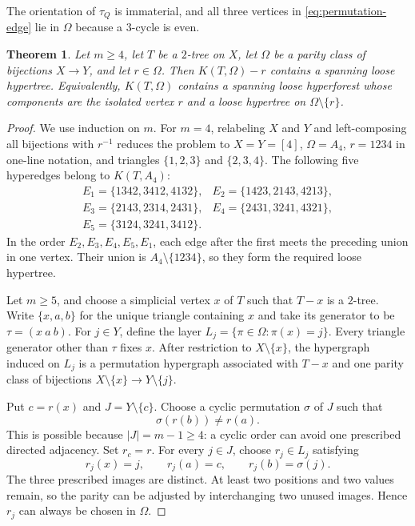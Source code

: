 \documentclass[4pt]{article} %
\newtheorem{theorem}{Theorem}[section]
\begin{document}
The orientation of $\tau_Q$ is immaterial, and all three vertices in
\eqref{eq:permutation-edge} lie in $\Omega$ because a $3$-cycle is even.

\begin{theorem}\label{thm:root-deleted}
Let $m\geq4$, let $T$ be a $2$-tree on $X$, let $\Omega$ be a parity class
of bijections $X\to Y$, and let $r\in\Omega$. Then $K(T,\Omega)-r$ contains
a spanning loose hypertree. Equivalently, $K(T,\Omega)$ contains a spanning
loose hyperforest whose components are the isolated vertex $r$ and a loose
hypertree on $\Omega\setminus\{r\}$.
\end{theorem}

\begin{proof}
We use induction on $m$. For $m=4$, relabeling $X$ and $Y$ and
left-composing all bijections with $r^{-1}$ reduces the problem to
$X=Y=[4]$, $\Omega=A_4$, $r=1234$ in one-line notation, and triangles
$\{1,2,3\}$ and $\{2,3,4\}$. The following five hyperedges belong to
$K(T,A_4)$:
\[
\begin{array}{ll}
 E_1=\{1342,3412,4132\},&
 E_2=\{1423,2143,4213\},\\
 E_3=\{2143,2314,2431\},&
 E_4=\{2431,3241,4321\},\\
 E_5=\{3124,3241,3412\}.&
\end{array}
\]
In the order $E_2,E_3,E_4,E_5,E_1$, each edge after the first meets the
preceding union in one vertex. Their union is $A_4\setminus\{1234\}$, so
they form the required loose hypertree.

Let $m\geq5$, and choose a simplicial vertex $x$ of $T$ such that $T-x$ is a
$2$-tree. Write $\{x,a,b\}$ for the unique triangle containing $x$ and take
its generator to be
$
 \tau=(x\ a\ b).
$
For $j\in Y$, define the layer
$
 L_j=\{\pi\in\Omega:\pi(x)=j\}.
$
Every triangle generator other than $\tau$ fixes $x$. After restriction to
$X\setminus\{x\}$, the hypergraph induced on $L_j$ is a permutation
hypergraph associated with $T-x$ and one parity class of bijections
$X\setminus\{x\}\to Y\setminus\{j\}$.

Put $c=r(x)$ and $J=Y\setminus\{c\}$. Choose a cyclic permutation $\sigma$
of $J$ such that
\begin{equation}\label{eq:sigma-condition}
 \sigma(r(b))\neq r(a).
\end{equation}
This is possible because $|J|=m-1\geq4$: a cyclic order can avoid one
prescribed directed adjacency. Set $r_c=r$. For every $j\in J$, choose
$r_j\in L_j$ satisfying
\begin{equation}\label{eq:rj}
 r_j(x)=j,\qquad r_j(a)=c,\qquad r_j(b)=\sigma(j).
\end{equation}
The three prescribed images are distinct. At least two positions and two
values remain, so the parity can be adjusted by interchanging two unused
images. Hence $r_j$ can always be chosen in $\Omega$.


\end{proof}
\end{document}
